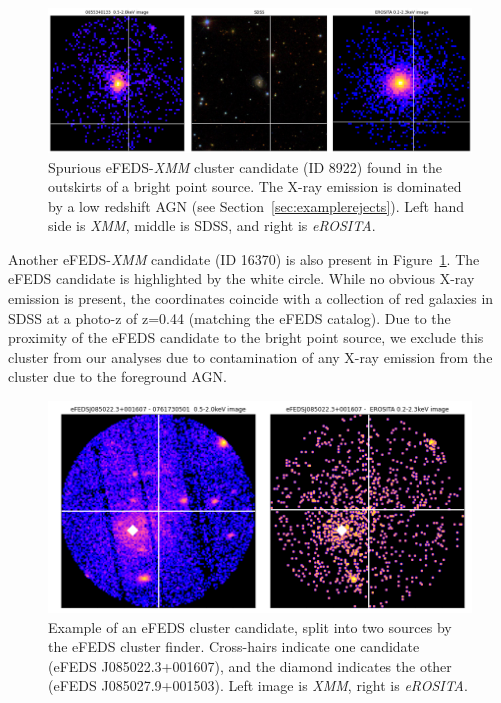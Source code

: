 \documentclass[fleqn,usenatbib]{mnras}
\begin{document}
\begin{figure}
    \centering
    \includegraphics[width=1\textwidth]{images/outskirt_cands.png}
    \caption[]{Spurious eFEDS-{\em XMM} cluster candidate (ID 8922) found in the outskirts of a bright point source.  The X-ray emission is dominated by a low redshift AGN (see Section~\ref{sec:examplerejects}). Left hand side is {\em XMM}, middle is SDSS, and right is {\em eROSITA}.}
    \label{fig:brightoutskirts}
\end{figure}

Another eFEDS-{\em XMM} candidate (ID 16370) is also present in Figure~\ref{fig:brightoutskirts}.  The eFEDS candidate is highlighted by the white circle.  While no obvious X-ray emission is present, the coordinates coincide with a collection of red galaxies in SDSS at a photo-z of z=0.44 (matching the eFEDS catalog).  Due to the proximity of the eFEDS candidate to the bright point source, we exclude this cluster from our analyses due to contamination of any X-ray emission from the cluster due to the foreground AGN.

\begin{figure}
    \centering
    \includegraphics[width=1\columnwidth]{images/split_cluster.png}
    \caption[]{Example of an eFEDS cluster candidate, split into two sources by the eFEDS cluster finder. Cross-hairs indicate one candidate (eFEDS J085022.3+001607), and the diamond indicates the other (eFEDS J085027.9+001503). Left image is {\em XMM}, right is {\em eROSITA}.}
    \label{fig:splitcluster}
\end{figure}
\end{document}
